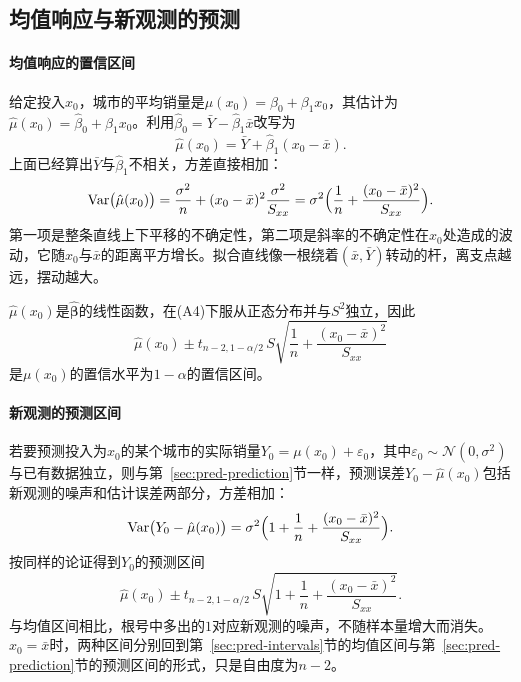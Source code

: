 \subsection{均值响应与新观测的预测}

\paragraph{均值响应的置信区间}

给定投入$x_0$，城市的平均销量是$\mu(x_0)=\beta_0+\beta_1x_0$，其估计为$\hat\mu(x_0)=\hat\beta_0+\hat\beta_1x_0$。利用$\hat\beta_0=\bar Y-\hat\beta_1\bar x$改写为
\[
 \hat\mu(x_0)=\bar Y+\hat\beta_1(x_0-\bar x).
\]
上面已经算出$\bar Y$与$\hat\beta_1$不相关，方差直接相加：
\begin{equation}
 \operatorname{Var}\bigl(\hat\mu(x_0)\bigr)=\frac{\sigma^2}n+(x_0-\bar x)^2\frac{\sigma^2}{S_{xx}}
 =\sigma^2\Bigl(\frac1n+\frac{(x_0-\bar x)^2}{S_{xx}}\Bigr).
 \label{eq:pred-mean-response-variance}
\end{equation}
第一项是整条直线上下平移的不确定性，第二项是斜率的不确定性在$x_0$处造成的波动，它随$x_0$与$\bar x$的距离平方增长。拟合直线像一根绕着$(\bar x,\bar Y)$转动的杆，离支点越远，摆动越大。

$\hat\mu(x_0)$是$\hat{\bm\beta}$的线性函数，在(A4)下服从正态分布并与$S^2$独立，因此
\[
 \hat\mu(x_0)\pm t_{n-2,1-\alpha/2}\,S\sqrt{\frac1n+\frac{(x_0-\bar x)^2}{S_{xx}}}
\]
是$\mu(x_0)$的置信水平为$1-\alpha$的置信区间。

\paragraph{新观测的预测区间}

若要预测投入为$x_0$的某个城市的实际销量$Y_0=\mu(x_0)+\varepsilon_0$，其中$\varepsilon_0\sim\mathcal N(0,\sigma^2)$与已有数据独立，则与第~\ref{sec:pred-prediction}节一样，预测误差$Y_0-\hat\mu(x_0)$包括新观测的噪声和估计误差两部分，方差相加：
\[
 \operatorname{Var}\bigl(Y_0-\hat\mu(x_0)\bigr)=\sigma^2\Bigl(1+\frac1n+\frac{(x_0-\bar x)^2}{S_{xx}}\Bigr).
\]
按同样的论证得到$Y_0$的预测区间
\begin{equation}
 \hat\mu(x_0)\pm t_{n-2,1-\alpha/2}\,S\sqrt{1+\frac1n+\frac{(x_0-\bar x)^2}{S_{xx}}}.
 \label{eq:pred-regression-prediction-interval}
\end{equation}
与均值区间相比，根号中多出的$1$对应新观测的噪声，不随样本量增大而消失。$x_0=\bar x$时，两种区间分别回到第~\ref{sec:pred-intervals}节的均值区间与第~\ref{sec:pred-prediction}节的预测区间的形式，只是自由度为$n-2$。

